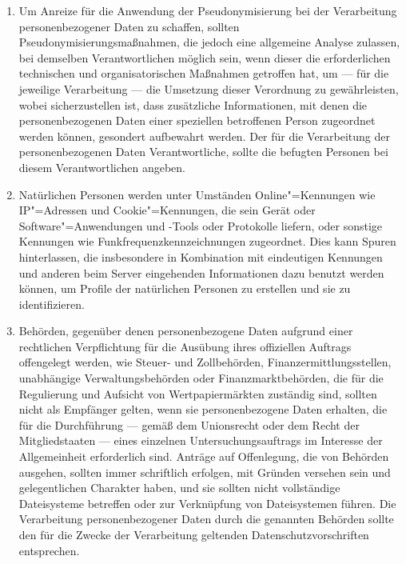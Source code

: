 \begin{enumerate}

   \item Um Anreize für die Anwendung der Pseudonymisierung bei der Verarbeitung personenbezogener Daten zu schaffen,
    sollten Pseudonymisierungsmaßnahmen, die jedoch eine allgemeine Analyse zulassen, bei demselben Verantwortlichen
    möglich sein, wenn dieser die erforderlichen technischen und organisatorischen Maßnahmen getroffen hat, um — für
    die jeweilige Verarbeitung — die Umsetzung dieser Verordnung zu gewährleisten, wobei sicherzustellen ist, dass
    zusätzliche Informationen, mit denen die personenbezogenen Daten einer speziellen betroffenen Person zugeordnet
    werden können, gesondert aufbewahrt werden. Der für die Verarbeitung der personenbezogenen Daten Verantwortliche,
    sollte die befugten Personen bei diesem Verantwortlichen angeben.%
   \label{itm:eg-29}
   

   \item Natürlichen Personen werden unter Umständen Online"=Kennungen wie IP"=Adressen und Cookie"=Kennungen, die sein
    Gerät oder Software"=Anwendungen und -Tools oder Protokolle liefern, oder sonstige Kennungen wie
    Funkfrequenzkennzeichnungen zugeordnet. Dies kann Spuren hinterlassen, die insbesondere in Kombination mit
    eindeutigen Kennungen und anderen beim Server eingehenden Informationen dazu benutzt werden können, um Profile der
    natürlichen Personen zu erstellen und sie zu identifizieren.%
   \label{itm:eg-30}
   

   \item Behörden, gegenüber denen personenbezogene Daten aufgrund einer rechtlichen Verpflichtung für die Ausübung
    ihres offiziellen Auftrags offengelegt werden, wie Steuer- und Zollbehörden, Finanzermittlungsstellen, unabhängige
    Verwaltungsbehörden oder Finanzmarktbehörden, die für die Regulierung und Aufsicht von Wertpapiermärkten zuständig
    sind, sollten nicht als Empfänger gelten, wenn sie personenbezogene Daten erhalten, die für die Durchführung —
    gemäß dem Unionsrecht oder dem Recht der Mitgliedstaaten — eines einzelnen Untersuchungsauftrags im Interesse der
    Allgemeinheit erforderlich sind. Anträge auf Offenlegung, die von Behörden ausgehen, sollten immer schriftlich
    erfolgen, mit Gründen versehen sein und gelegentlichen Charakter haben, und sie sollten nicht vollständige
    Dateisysteme betreffen oder zur Verknüpfung von Dateisystemen führen. Die Verarbeitung personenbezogener Daten
    durch die genannten Behörden sollte den für die Zwecke der Verarbeitung geltenden Datenschutzvorschriften
    entsprechen.%
   \label{itm:eg-31}
   

\end{enumerate}
